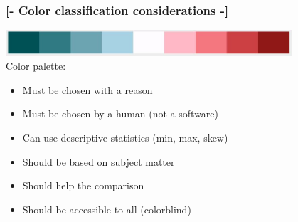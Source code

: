 \documentclass[xcolor=x11names,compress]{beamer}
\renewcommand{\(}{\begin{columns}}
\renewcommand{\)}{\end{columns}}
\newcommand{\<}[1]{\begin{column}{#1}}
\renewcommand{\>}{\end{column}}
\begin{document}
\begin{frame}
\begin{center}
\begin{itemize}
   
    \end{itemize}
\end{center}
\end{frame}

\begin{frame} %
\frametitle{\textcolor{brique}{[-  \textbf{Color classification considerations} -]}}
{\centering
\includegraphics[width = 0.8\textwidth]{M5-ColorBlindPalette.JPG}
} \\
Color palette: \\
\vspace{0.5cm}
\begin{itemize}[<+-|alert@+>]
    \item  Must be chosen with a reason
    \item  Must be chosen  by a human (not a software)
    \item  Can use descriptive statistics (min, max, skew)
    \item  Should be based on subject matter
    \item  Should help the comparison
    \item  Should be accessible to all (colorblind)
\end{itemize}
\end{frame}
\end{document}
